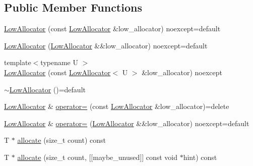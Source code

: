 \subsection*{Public Member Functions}
\begin{DoxyCompactItemize}
\item 
\mbox{\hyperlink{classmage_1_1_double_ended_memory_stack_1_1_low_allocator_aae78b9e9c97d6a4dbd234cfb52d4059d}{Low\+Allocator}} (const \mbox{\hyperlink{classmage_1_1_double_ended_memory_stack_1_1_low_allocator}{Low\+Allocator}} \&low\+\_\+allocator) noexcept=default
\item 
\mbox{\hyperlink{classmage_1_1_double_ended_memory_stack_1_1_low_allocator_aa60a12ecd37a8b586c718de9cb0e21b0}{Low\+Allocator}} (\mbox{\hyperlink{classmage_1_1_double_ended_memory_stack_1_1_low_allocator}{Low\+Allocator}} \&\&low\+\_\+allocator) noexcept=default
\item 
{\footnotesize template$<$typename U $>$ }\\\mbox{\hyperlink{classmage_1_1_double_ended_memory_stack_1_1_low_allocator_a51363b1e806c3ad9753aae67d0bfc635}{Low\+Allocator}} (const \mbox{\hyperlink{classmage_1_1_double_ended_memory_stack_1_1_low_allocator}{Low\+Allocator}}$<$ U $>$ \&low\+\_\+allocator) noexcept
\item 
\mbox{\hyperlink{classmage_1_1_double_ended_memory_stack_1_1_low_allocator_aa049f2291b58ff196b987adf126f0906}{$\sim$\+Low\+Allocator}} ()=default
\item 
\mbox{\hyperlink{classmage_1_1_double_ended_memory_stack_1_1_low_allocator}{Low\+Allocator}} \& \mbox{\hyperlink{classmage_1_1_double_ended_memory_stack_1_1_low_allocator_a709076f9dc2e900814039cecd145d32a}{operator=}} (const \mbox{\hyperlink{classmage_1_1_double_ended_memory_stack_1_1_low_allocator}{Low\+Allocator}} \&low\+\_\+allocator)=delete
\item 
\mbox{\hyperlink{classmage_1_1_double_ended_memory_stack_1_1_low_allocator}{Low\+Allocator}} \& \mbox{\hyperlink{classmage_1_1_double_ended_memory_stack_1_1_low_allocator_a5cdfc73e8f91ec41f5efa3499141f3b3}{operator=}} (\mbox{\hyperlink{classmage_1_1_double_ended_memory_stack_1_1_low_allocator}{Low\+Allocator}} \&\&low\+\_\+allocator) noexcept=default
\item 
T $\ast$ \mbox{\hyperlink{classmage_1_1_double_ended_memory_stack_1_1_low_allocator_a3f588eb388460aa150f56c00553c1af0}{allocate}} (size\+\_\+t count) const
\item 
T $\ast$ \mbox{\hyperlink{classmage_1_1_double_ended_memory_stack_1_1_low_allocator_ab74dc1aaadfd3144ac5847df7e5f73f2}{allocate}} (size\+\_\+t count, \mbox{[}\mbox{[}maybe\+\_\+unused\mbox{]}\mbox{]} const void $\ast$hint) const

\end{DoxyCompactItemize}

